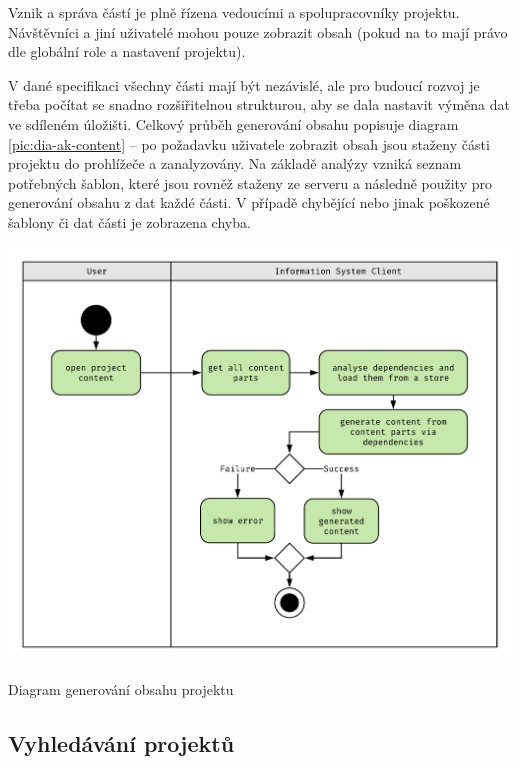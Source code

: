 Vznik a správa částí je plně řízena vedoucími a spolupracovníky projektu. Návštěvníci a jiní uživatelé mohou pouze zobrazit obsah (pokud na to mají právo dle globální role a nastavení projektu).

V dané specifikaci všechny části mají být nezávislé, ale pro budoucí rozvoj je třeba počítat se snadno rozšiřitelnou strukturou, aby se dala nastavit výměna dat ve sdíleném úložišti. Celkový průběh generování obsahu popisuje diagram \ref{pic:dia-ak-content} -- po požadavku uživatele zobrazit obsah jsou staženy části projektu do prohlížeče a zanalyzovány. Na základě analýzy vzniká seznam potřebných šablon, které jsou rovněž staženy ze serveru a následně použity pro generování obsahu z dat každé části. V případě chybějící nebo jinak poškozené šablony či dat části je zobrazena chyba.

\begin{fig:illustration}
   \includegraphics[width=1\textwidth]{images/dia-ak-content.pdf}
   \caption{Diagram generování obsahu projektu}\label{pic:dia-ak-content}
\end{fig:illustration}




\subsection{Vyhledávání projektů}

